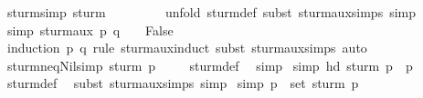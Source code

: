\begin{isabellebody}
\isanewline
{}\isamarkupfalse%
\ sturm{\isacharunderscore}{}{\isacharbrackleft}simp{\isacharbrackright}{\isacharcolon}\ {\isachardoublequoteopen}sturm\ {}\ {\isacharequal}\ {\isacharbrackleft}{}{\isacharcomma}{}{\isacharbrackright}{\isachardoublequoteclose}\isanewline
%
\isadelimproof
\ \ \ \ %
\endisadelimproof
%
\isatagproof
{}\isamarkupfalse%
\ {\isacharparenleft}unfold\ sturm{\isacharunderscore}def{\isacharcomma}\ subst\ sturm{\isacharunderscore}aux{\isachardot}simps{\isacharcomma}\ simp{\isacharparenright}%
\endisatagproof
{\isafoldproof}%
%
\isadelimproof
\isanewline
%
\endisadelimproof
\isanewline
{}\isamarkupfalse%
\ {\isacharbrackleft}simp{\isacharbrackright}{\isacharcolon}\ {\isachardoublequoteopen}sturm{\isacharunderscore}aux\ p\ q\ {\isacharequal}\ {\isacharbrackleft}{\isacharbrackright}\ {\isasymlongleftrightarrow}\ False{\isachardoublequoteclose}\isanewline
%
\isadelimproof
\ \ \ \ %
\endisadelimproof
%
\isatagproof
{}\isamarkupfalse%
\ {\isacharparenleft}induction\ p\ q\ rule{\isacharcolon}\ sturm{\isacharunderscore}aux{\isachardot}induct{\isacharcomma}\ subst\ sturm{\isacharunderscore}aux{\isachardot}simps{\isacharcomma}\ auto{\isacharparenright}%
\endisatagproof
{\isafoldproof}%
%
\isadelimproof
\isanewline
%
\endisadelimproof
\isanewline
{}\isamarkupfalse%
\ sturm{\isacharunderscore}neq{\isacharunderscore}Nil{\isacharbrackleft}simp{\isacharbrackright}{\isacharcolon}\ {\isachardoublequoteopen}sturm\ p\ {\isasymnoteq}\ {\isacharbrackleft}{\isacharbrackright}{\isachardoublequoteclose}%
\isadelimproof
\ %
\endisadelimproof
%
\isatagproof
{}\isamarkupfalse%
\ sturm{\isacharunderscore}def\ \isamarkupfalse%
\ simp%
\endisatagproof
{\isafoldproof}%
%
\isadelimproof
%
\endisadelimproof
\isanewline
\isanewline
{}\isamarkupfalse%
\ {\isacharbrackleft}simp{\isacharbrackright}{\isacharcolon}\ {\isachardoublequoteopen}hd\ {\isacharparenleft}sturm\ p{\isacharparenright}\ {\isacharequal}\ p{\isachardoublequoteclose}\isanewline
%
\isadelimproof
\ \ %
\endisadelimproof
%
\isatagproof
{}\isamarkupfalse%
\ sturm{\isacharunderscore}def\ \isamarkupfalse%
\ {\isacharparenleft}subst\ sturm{\isacharunderscore}aux{\isachardot}simps{\isacharcomma}\ simp{\isacharparenright}%
\endisatagproof
{\isafoldproof}%
%
\isadelimproof
\isanewline
%
\endisadelimproof
\isanewline
{}\isamarkupfalse%
\ {\isacharbrackleft}simp{\isacharbrackright}{\isacharcolon}\ {\isachardoublequoteopen}p\ {\isasymin}\ set\ {\isacharparenleft}sturm\ p{\isacharparenright}{\isachardoublequoteclose}\ \isanewline

\end{isabellebody}
